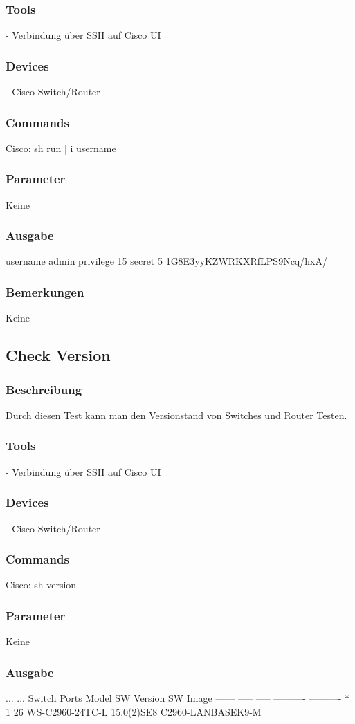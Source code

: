 \documentclass[a4,12pt]{scrartcl}
\begin{document}
\subsubsection{Tools}
- Verbindung über SSH auf Cisco UI 
\subsubsection{Devices}
- Cisco Switch/Router
\subsubsection{Commands}
Cisco: sh run | i username
\subsubsection{Parameter}
Keine
\subsubsection{Ausgabe}
username admin privilege 15 secret 5 1G8E3yyKZWRKXRfLPS9Ncq/hxA/
\subsubsection{Bemerkungen}
Keine

\subsection{Check Version}
\subsubsection{Beschreibung}
Durch diesen Test kann man den Versionstand von Switches und Router Testen.
\subsubsection{Tools}
- Verbindung über SSH auf Cisco UI
\subsubsection{Devices}
- Cisco Switch/Router
\subsubsection{Commands}
Cisco: sh version
\subsubsection{Parameter}
Keine
\subsubsection{Ausgabe}
...\newline
...\newline
Switch Ports Model              SW Version            SW Image\newline
------ ----- -----              ----------            ----------\newline
*    1 26    WS-C2960-24TC-L    15.0(2)SE8            C2960-LANBASEK9-M\newline
\end{document}
